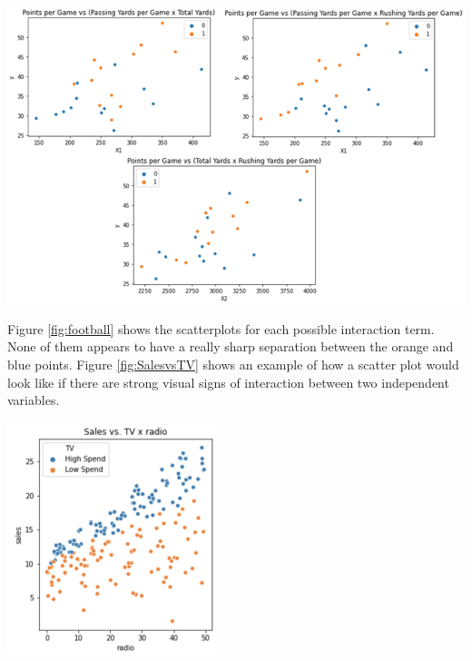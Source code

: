 \documentclass[a4paper,12pt]{report}
\begin{document}
\begin{center}
    \captionsetup{type=figure}
    \includegraphics[width=.9\linewidth]{media/football.png}
    \label{fig:football}
\end{center}

Figure \ref{fig:football} shows the scatterplots for each possible interaction term. None of them appears to have a really sharp separation between the orange and blue points. Figure \ref{fig:SalesvsTV} shows an example of how a scatter plot would look like if there are strong visual signs of interaction between two independent variables.

\begin{center}
    \captionsetup{type=figure}
    \includegraphics[width=.9\linewidth]{media/SalesvsTV.png}
    \label{fig:SalesvsTV}
\end{center}
\end{document}
